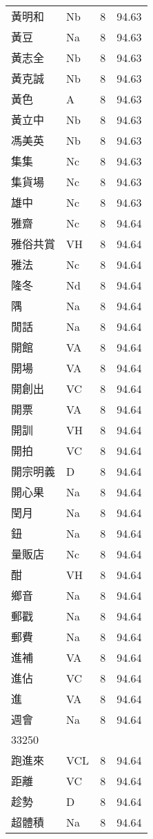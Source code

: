 \documentclass[twocolumn]{book}
\begin{document}
\begin{supertabular}{llrr}
黃明和 & Nb & 8 &  94.63\\
黃豆 & Na & 8 &  94.63\\
黃志全 & Nb & 8 &  94.63\\
黃克誠 & Nb & 8 &  94.63\\
黃色 & A & 8 &  94.63\\
黃立中 & Nb & 8 &  94.63\\
馮美英 & Nb & 8 &  94.63\\
集集 & Nc & 8 &  94.63\\
集貨場 & Nc & 8 &  94.63\\
雄中 & Nc & 8 &  94.63\\
雅齋 & Nc & 8 &  94.64\\
雅俗共賞 & VH & 8 &  94.64\\
雅法 & Nc & 8 &  94.64\\
隆冬 & Nd & 8 &  94.64\\
隅 & Na & 8 &  94.64\\
閒話 & Na & 8 &  94.64\\
開館 & VA & 8 &  94.64\\
開場 & VA & 8 &  94.64\\
開創出 & VC & 8 &  94.64\\
開票 & VA & 8 &  94.64\\
開訓 & VH & 8 &  94.64\\
開拍 & VC & 8 &  94.64\\
開宗明義 & D & 8 &  94.64\\
開心果 & Na & 8 &  94.64\\
閏月 & Na & 8 &  94.64\\
鈕 & Na & 8 &  94.64\\
量販店 & Nc & 8 &  94.64\\
酣 & VH & 8 &  94.64\\
鄉音 & Na & 8 &  94.64\\
郵戳 & Na & 8 &  94.64\\
郵費 & Na & 8 &  94.64\\
進補 & VA & 8 &  94.64\\
進佔 & VC & 8 &  94.64\\
進 & VA & 8 &  94.64\\
週會 & Na & 8 &  94.64\\
33250\\
跑進來 & VCL & 8 &  94.64\\
距離 & VC & 8 &  94.64\\
趁勢 & D & 8 &  94.64\\
超體積 & Na & 8 &  94.64\\

\end{supertabular}
\end{document}
